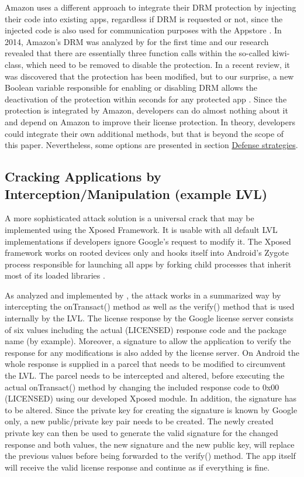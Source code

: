 \documentclass{sig-alternate}
\begin{document}
Amazon uses a different approach to integrate their DRM protection by injecting their code into existing apps, regardless if DRM is requested or not, since the injected code is also used for communication purposes with the Appstore \cite{AT3}.
In 2014, Amazon's DRM was analyzed by \cite{xAT4} for the first time and our research revealed that there are essentially three function calls within the so-called kiwi-class, which need to be removed to disable the protection. In a recent review, it was discovered that the protection has been modified, but to our surprise, a new Boolean variable responsible for enabling or disabling DRM allows the deactivation of the protection within seconds for any protected app \cite{xAT7}. 
Since the protection is integrated by Amazon, developers can do almost nothing about it and depend on Amazon to improve their license protection. In theory, developers could integrate their own additional methods, but that is beyond the scope of this paper. Nevertheless, some options are presented in section \hyperref[defense]{Defense strategies}.


\subsection{Cracking Applications by Interception/Manipulation (example LVL)}

A more sophisticated attack solution is a universal crack that may be implemented using the Xposed Framework. It is usable with all default LVL implementations \cite{xAT4} if developers ignore Google's request to modify it. The Xposed framework works on rooted devices only and hooks itself into Android's Zygote process  responsible for launching all apps by forking child processes that inherit most of its loaded libraries \cite{AT4} . 

As analyzed and implemented by \cite{xAT4}, the attack works in a summarized way by intercepting the onTransact() method as well as the verify() method that is used internally by the LVL. The license response by the Google license server consists of six values including the actual (LICENSED) response code and the package name (by example). Moreover, a signature to allow the application to verify the response for any modifications is also added by the license server. On Android the whole response is supplied in a parcel that needs to be modified to circumvent the LVL. The parcel needs to be intercepted and altered, before executing the actual onTransact() method by changing the included response code to 0x00 (LICENSED) using our developed Xposed module. In addition, the signature has to be altered. Since the private key for creating the signature is known by Google only, a new public/private key pair needs to be created. The newly created private key can then be used to generate the valid signature for the changed response and both values, the new signature and the new public key, will replace the previous values before being forwarded to the verify() method. The app itself will receive the valid license response and continue as if everything is fine. \\
\end{document}
